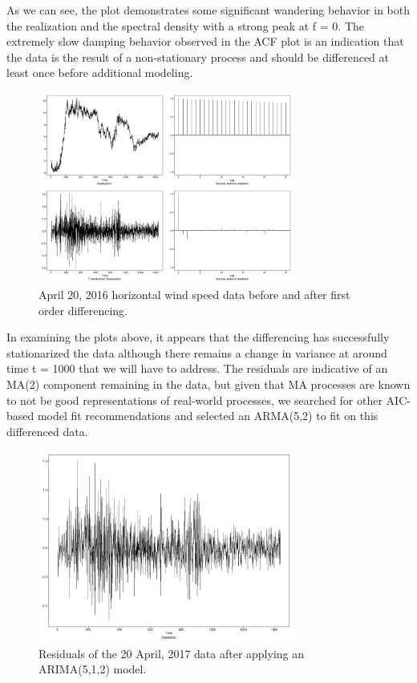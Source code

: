 \documentclass{llncs}
\begin{document}
As we can see, the plot demonstrates some significant wandering behavior in both the realization and the spectral density with a strong peak at f = 0. The extremely slow damping behavior observed in the ACF plot is an indication that the data is the result of a non-stationary process and should be differenced at least once before additional modeling.

\begin{figure}
  \centering
  \includegraphics[width=0.75\textwidth]{apr_20_differenced.png}
  \caption{April 20, 2016 horizontal wind speed data before and after first order differencing.}
  \label{fig:apr20differenced}
\end{figure}

In examining the plots above, it appears that the differencing has successfully stationarized the data although there remains a change in variance at around time t = 1000 that we will have to address. The residuals are indicative of an MA(2) component remaining in the data, but given that MA processes are known to not be good representations of real-world processes, we searched for other AIC-based model fit recommendations and selected an ARMA(5,2) to fit on this differenced data.

\begin{figure}
  \centering
  \includegraphics[width=0.75\textwidth]{apr_20_residuals.png}
  \caption{Residuals of the 20 April, 2017 data after applying an ARIMA(5,1,2) model.}
  \label{fig:apr20residuals}
\end{figure}
\end{document}
